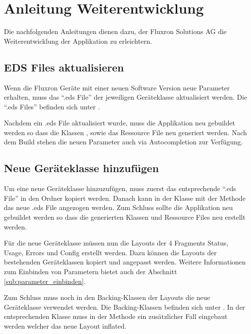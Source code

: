 \section{Anleitung Weiterentwicklung}
\label{anleitung_weiterentwicklung}

Die nachfolgenden Anleitungen dienen dazu, der Fluxron Solutions AG die Weiterentwicklung der Applikation zu erleichtern.

\subsection{EDS Files aktualisieren}
Wenn die Fluxron Geräte mit einer neuen Software Version neue Parameter erhalten, muss das \enquote{.eds File} der jeweiligen Geräteklasse aktualisiert werden.
Die \enquote{.eds Files} befinden sich unter .

Nachdem ein .eds File aktualisiert wurde, muss die Applikation neu gebuildet werden so dass die Klassen ,  sowie das Ressource File  neu generiert werden. Nach dem Build stehen die neuen Parameter auch via Autocompletion zur Verfügung.

\subsection{Neue Geräteklasse hinzufügen}
Um eine neue Geräteklasse hinzuzufügen, muss zuerst das entsprechende \enquote{.eds File} in den Ordner  kopiert werden. Danach kann in der Klasse  mit der Methode  das neue .eds File angezogen werden. Zum Schluss sollte die Applikation neu gebuildet werden so dass die generierten Klassen und Ressource Files neu erstellt werden.

Für die neue Geräteklasse müssen nun die Layouts der 4 Fragments Status, Usage, Errors und Config erstellt werden. Dazu können die Layouts der bestehenden Geräteklassen kopiert und angepasst werden. Weitere Informationen zum Einbinden von Parametern bietet auch der Abschnitt \ref{sub:parameter_einbinden}.

Zum Schluss muss noch in den Backing-Klassen der Layouts die neue Geräteklasse verwendet werden. Die Backing-Klassen befinden sich unter  . In der entsprechenden Klasse muss in der Methode  ein zusätzlicher Fall eingebaut werden welcher das neue Layout inflated.

